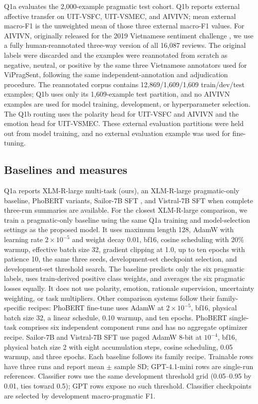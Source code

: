 Q1a evaluates the 2,000-example pragmatic test cohort. Q1b reports external affective transfer on UIT-VSFC, UIT-VSMEC, and AIVIVN; mean external macro-F1 is the unweighted mean of those three external macro-F1 values. For AIVIVN, originally released for the 2019 Vietnamese sentiment challenge \citep{nguyen-etal-2020-aivivn}, we use a fully human-reannotated three-way version of all 16,087 reviews. The original labels were discarded and the examples were reannotated from scratch as negative, neutral, or positive by the same three Vietnamese annotators used for ViPragSent, following the same independent-annotation and adjudication procedure. The reannotated corpus contains 12,869/1,609/1,609 train/dev/test examples; Q1b uses only its 1,609-example test partition, and no AIVIVN examples are used for model training, development, or hyperparameter selection. The Q1b routing uses the polarity head for UIT-VSFC and AIVIVN and the emotion head for UIT-VSMEC. These external evaluation partitions were held out from model training, and no external evaluation example was used for fine-tuning.

\subsection{Baselines and measures}
Q1a reports XLM-R-large multi-task (ours), an XLM-R-large pragmatic-only baseline, PhoBERT variants, Sailor-7B SFT \citep{dou-etal-2024-sailor}, and Vistral-7B SFT \citep{nguyen-etal-2023-vistral} when complete three-run summaries are available. For the closest XLM-R-large comparison, we train a pragmatic-only baseline using the same Q1a training and model-selection settings as the proposed model. It uses maximum length 128, AdamW with learning rate $2\times10^{-5}$ and weight decay 0.01, bf16, cosine scheduling with 20\% warmup, effective batch size 32, gradient clipping at 1.0, up to ten epochs with patience 10, the same three seeds, development-set checkpoint selection, and development-set threshold search. The baseline predicts only the six pragmatic labels, uses train-derived positive class weights, and averages the six pragmatic losses equally. It does not use polarity, emotion, rationale supervision, uncertainty weighting, or task multipliers. Other comparison systems follow their family-specific recipes: PhoBERT fine-tune uses AdamW at $2\times10^{-5}$, bf16, physical batch size 32, a linear schedule, 0.10 warmup, and ten epochs. PhoBERT single-task comprises six independent component runs and has no aggregate optimizer recipe. Sailor-7B and Vistral-7B SFT use paged AdamW 8-bit at $10^{-4}$, bf16, physical batch size 2 with eight accumulation steps, cosine scheduling, 0.05 warmup, and three epochs. Each baseline follows its family recipe. Trainable rows have three runs and report mean $\pm$ sample SD; GPT-4.1-mini rows are single-run references. Classifier rows use the same development threshold grid (0.05--0.95 by 0.01, ties toward 0.5); GPT rows expose no such threshold. Classifier checkpoints are selected by development macro-pragmatic F1.

